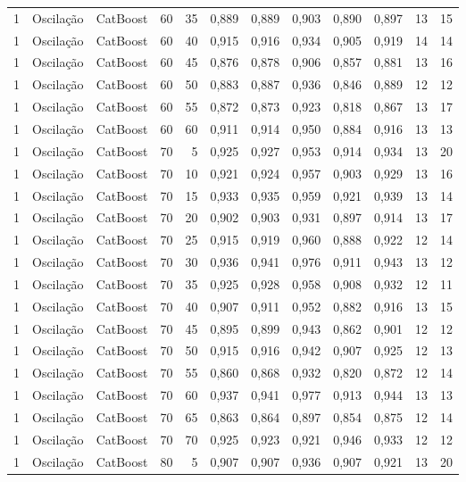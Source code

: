 \begin{longtable}{@{}rllrrrrrrrrr@{}}
1 & Oscilação & CatBoost & 60 & 35 & 0,889 & 0,889 & 0,903 & 0,890 & 0,897 & 13 & 15 \\
1 & Oscilação & CatBoost & 60 & 40 & 0,915 & 0,916 & 0,934 & 0,905 & 0,919 & 14 & 14 \\
1 & Oscilação & CatBoost & 60 & 45 & 0,876 & 0,878 & 0,906 & 0,857 & 0,881 & 13 & 16 \\
1 & Oscilação & CatBoost & 60 & 50 & 0,883 & 0,887 & 0,936 & 0,846 & 0,889 & 12 & 12 \\
1 & Oscilação & CatBoost & 60 & 55 & 0,872 & 0,873 & 0,923 & 0,818 & 0,867 & 13 & 17 \\
1 & Oscilação & CatBoost & 60 & 60 & 0,911 & 0,914 & 0,950 & 0,884 & 0,916 & 13 & 13 \\
1 & Oscilação & CatBoost & 70 & 5 & 0,925 & 0,927 & 0,953 & 0,914 & 0,934 & 13 & 20 \\
1 & Oscilação & CatBoost & 70 & 10 & 0,921 & 0,924 & 0,957 & 0,903 & 0,929 & 13 & 16 \\
1 & Oscilação & CatBoost & 70 & 15 & 0,933 & 0,935 & 0,959 & 0,921 & 0,939 & 13 & 14 \\
1 & Oscilação & CatBoost & 70 & 20 & 0,902 & 0,903 & 0,931 & 0,897 & 0,914 & 13 & 17 \\
1 & Oscilação & CatBoost & 70 & 25 & 0,915 & 0,919 & 0,960 & 0,888 & 0,922 & 12 & 14 \\
1 & Oscilação & CatBoost & 70 & 30 & 0,936 & 0,941 & 0,976 & 0,911 & 0,943 & 13 & 12 \\
1 & Oscilação & CatBoost & 70 & 35 & 0,925 & 0,928 & 0,958 & 0,908 & 0,932 & 12 & 11 \\
1 & Oscilação & CatBoost & 70 & 40 & 0,907 & 0,911 & 0,952 & 0,882 & 0,916 & 13 & 15 \\
1 & Oscilação & CatBoost & 70 & 45 & 0,895 & 0,899 & 0,943 & 0,862 & 0,901 & 12 & 12 \\
1 & Oscilação & CatBoost & 70 & 50 & 0,915 & 0,916 & 0,942 & 0,907 & 0,925 & 12 & 13 \\
1 & Oscilação & CatBoost & 70 & 55 & 0,860 & 0,868 & 0,932 & 0,820 & 0,872 & 12 & 14 \\
1 & Oscilação & CatBoost & 70 & 60 & 0,937 & 0,941 & 0,977 & 0,913 & 0,944 & 13 & 13 \\
1 & Oscilação & CatBoost & 70 & 65 & 0,863 & 0,864 & 0,897 & 0,854 & 0,875 & 12 & 14 \\
1 & Oscilação & CatBoost & 70 & 70 & 0,925 & 0,923 & 0,921 & 0,946 & 0,933 & 12 & 12 \\
1 & Oscilação & CatBoost & 80 & 5 & 0,907 & 0,907 & 0,936 & 0,907 & 0,921 & 13 & 20 \\

\end{longtable}
